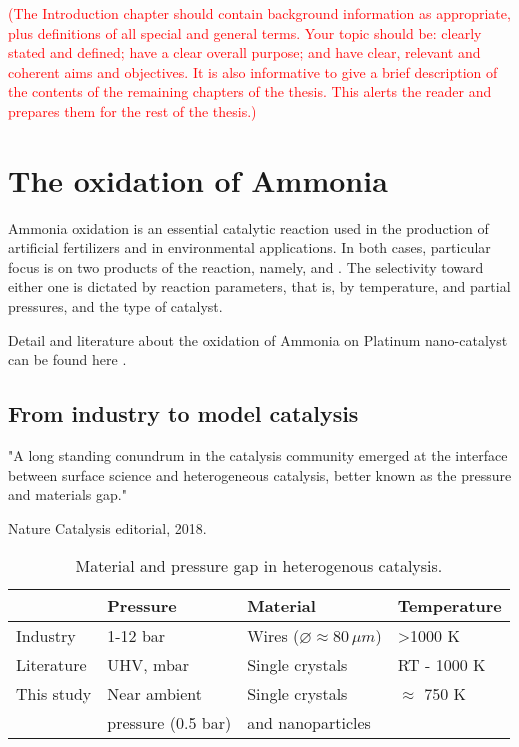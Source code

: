 \textcolor{red}{(The Introduction chapter should contain background information as appropriate, plus definitions of all special and general terms. Your topic should be: clearly stated and defined; have a clear overall purpose; and have clear, relevant and coherent aims and objectives. It is also informative to give a brief description of the contents of the remaining chapters of the thesis. This alerts the reader and prepares them for the rest of the thesis.)}

\section{The oxidation of Ammonia}

Ammonia oxidation is an essential catalytic reaction used in the production of artificial fertilizers and in environmental applications. In both cases, particular focus is on two products of the reaction, namely, \nitricoxide and \nitrogen. The selectivity toward either one is dictated by reaction parameters, that is, by temperature, \ammonia and \dioxygen partial pressures, and the type of catalyst.

Detail and literature about the oxidation of Ammonia on Platinum nano-catalyst can be found here \parencite{Resta2020a}.

\subsection{From industry to model catalysis}

"A long standing conundrum in the catalysis community emerged at the interface between surface science and heterogeneous catalysis, better known as the pressure and materials gap."

Nature Catalysis editorial, 2018.

\begin{table}[!htb]
    \centering
    \begin{tabular}{l|l|l|l}
    \toprule
                & Pressure    & Material       &     Temperature \\
    \midrule
    Industry   & 1-12 bar & Wires ($\diameter \approx 80 \, \mu m$) & \textgreater 1000 K \\
    \midrule
    Literature & UHV, mbar & Single crystals & RT - 1000 K \\ \midrule
    This study & Near ambient    & Single crystals  & $\approx$ 750 K \\
               & pressure (0.5 bar)  & and nanoparticles & \\
    \bottomrule
    \end{tabular}
    \caption{Material and pressure gap in heterogenous catalysis.}
    \label{tab:gap}
\end{table}

